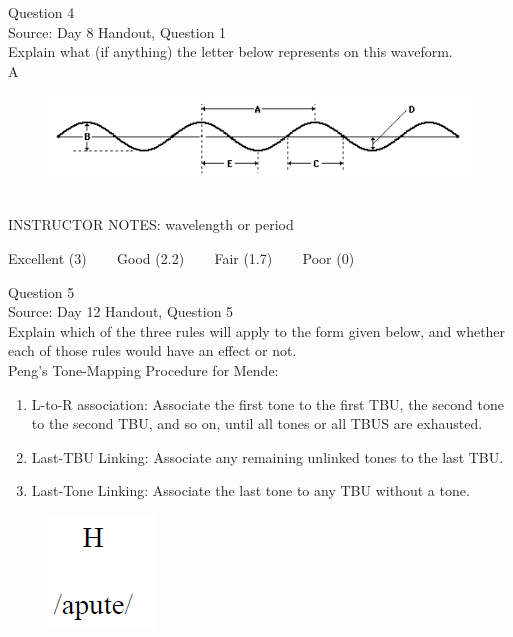 \documentclass[12pt]{article}
\begin{document}
{\large Question 4}\\

Source: Day 8 Handout, Question 1\\

Explain what (if anything) the letter below represents on this waveform.\\

A

\begin{figure}[H]
\includegraphics{../images/sinusoid.png}
\end{figure}

~\\
INSTRUCTOR NOTES: wavelength or period


\vfill
Excellent (3) ~~~ Good (2.2) ~~~ Fair (1.7) ~~~ Poor (0)
\newpage

{\large Question 5}\\

Source: Day 12 Handout, Question 5\\

Explain which of the three rules will apply to the form given below, and whether each of those rules would have an effect or not.\\

Peng’s Tone-Mapping Procedure for Mende: \begin{enumerate} \item L-to-R association: Associate the first tone to the first TBU, the second tone to the second TBU, and so on, until all tones or all TBUS are exhausted. \item Last-TBU Linking: Associate any remaining unlinked tones to the last TBU. \item Last-Tone Linking: Associate the last tone to any TBU without a tone. \end{enumerate}

\begin{figure}[H]
\includegraphics{../images/mendetone_b.png}
\end{figure}
\end{document}
